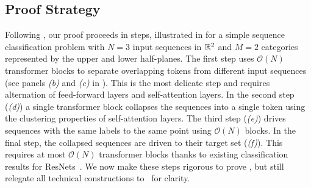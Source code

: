 \documentclass[11pt,a4paper]{amsart}
\begin{document}
\subsection{Proof Strategy}\label{sec:proof-outline}
Following \citet{geshkovski2024measure}, our proof proceeds in steps, illustrated in  for a simple sequence classification problem with $N=3$ input sequences in $\mathbb{R}^2$ and $M=2$ categories represented by the upper and lower half-planes. The first step uses $\mathcal{O}(N)$ transformer blocks to separate overlapping tokens from different input sequences (see panels \textit{(b)} and \textit{(c)} in ). This is the most delicate step and requires alternation of feed-forward layers and self-attention layers. In the second step (\textit{(d)}) a single transformer block collapses the sequences into a single token using the clustering properties of self-attention layers. The third step (\textit{(e)}) drives sequences with the same labels to the same point using $\mathcal{O}(N)$ blocks. In the final step, the collapsed sequences are driven to their target set (\textit{(f)}). This requires at most $\mathcal{O}(N)$ transformer blocks thanks to existing classification results for ResNets~\cite{domenec2023NODES}.
We now make these steps rigorous to prove , but still relegate all technical constructions to~ for clarity.
%
\end{document}
